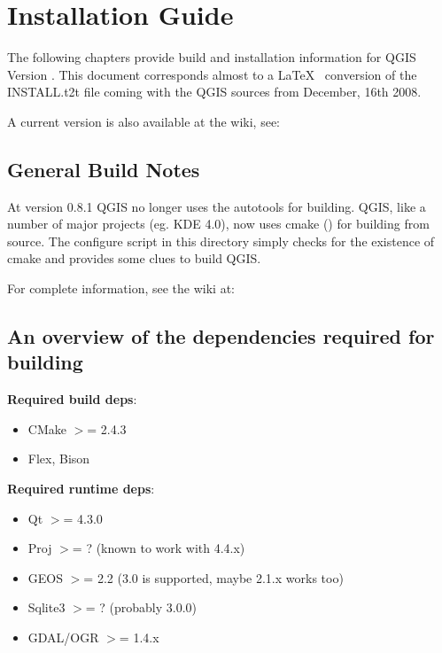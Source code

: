 
\section{Installation Guide}\label{label_install}

\updatedisclaimer

The following chapters provide build and installation information for QGIS
Version \CURRENT. This document corresponds almost to a \LaTeX~ conversion of
the INSTALL.t2t file coming with the QGIS sources from December, 16th 2008.

A current version is also available at the wiki, see:

\subsection{General Build Notes}
At version 0.8.1 QGIS no longer uses the autotools for building. QGIS, like a
number of major projects (eg. KDE 4.0), now uses cmake ()
for building from source. The configure script in this directory simply checks
for the existence of cmake and provides some clues to build QGIS.

For complete information, see the wiki at:

\subsection{An overview of the dependencies required for building}

\textbf{Required build deps}:

\begin{itemize}
\item CMake $>$= 2.4.3
\item Flex, Bison
\end{itemize}

\textbf{Required runtime deps}:

\begin{itemize}
\item Qt $>$= 4.3.0
\item Proj $>$= ? (known to work with 4.4.x)
\item GEOS $>$= 2.2 (3.0 is supported, maybe 2.1.x works too)
\item Sqlite3 $>$= ? (probably 3.0.0)
\item GDAL/OGR $>$= 1.4.x
\end{itemize}

